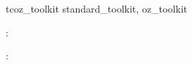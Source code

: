 \begin{zsection}
  \SECTION tcoz\_toolkit \parents standard\_toolkit, oz\_toolkit
\end{zsection}
















\begin{axdef}
  \time : \power \arithmos
\end{axdef}

\begin{axdef}
  \delta : \time
\end{axdef}
